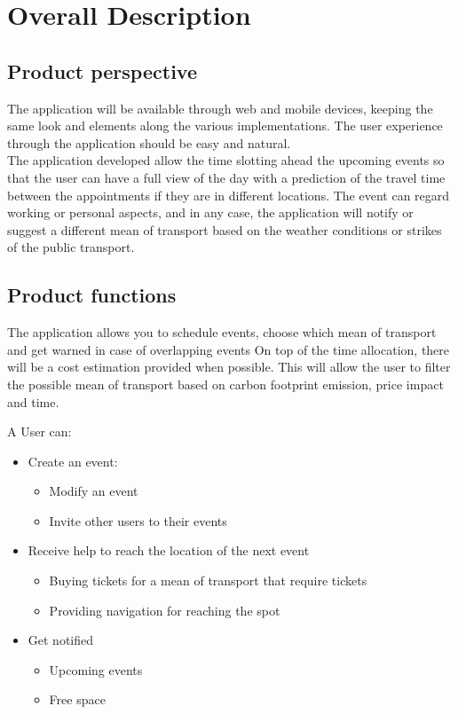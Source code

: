 \chapter{Overall Description}
\label{cha:desc}

\section{Product perspective}
\label{sec:productperspective}
The application will be available through web and mobile devices, keeping the same look and elements along the various implementations.
The user experience through the application should be easy and natural.
\\The application developed allow the time slotting ahead the upcoming events so that the user can have a full view of the day with a prediction of the travel time between the appointments if they are in different locations.
The event can regard working or personal aspects, and in any case, the application will notify or suggest a different mean of transport based on the weather conditions or strikes of the public transport.

\section{Product functions}
\label{sec:productfunctions}
The application allows you to schedule events, choose which mean of transport and get warned in case of overlapping events
On top of the time allocation, there will be a cost estimation provided when possible. 
This will allow the user to filter the possible mean of transport based on carbon footprint emission, price impact and time.

A User can:
\begin{itemize}
\item Create an event:
\begin{itemize}
\item Modify an event
\item Invite other users to their events
\end{itemize}
\item Receive help to reach the location of the next event
\begin{itemize}
\item Buying tickets for a mean of transport that require tickets
\item Providing navigation for reaching the spot 
\end{itemize}
\end{itemize}
\begin{itemize}
\item Get notified
\begin{itemize}
\item Upcoming events
\item Free space
\end{itemize}
\end{itemize}


